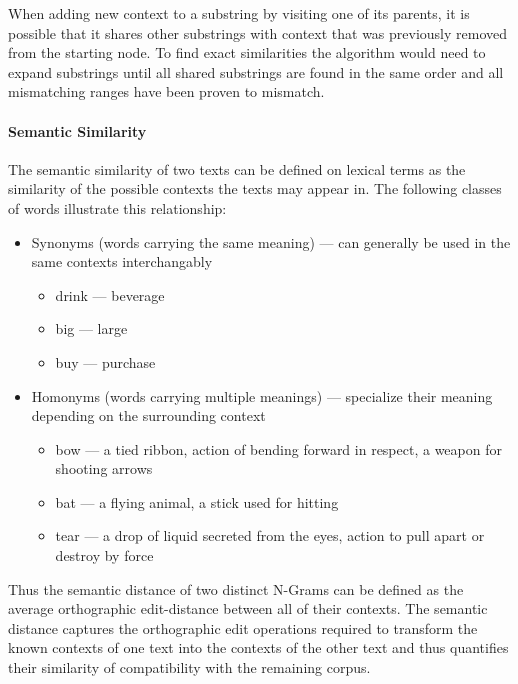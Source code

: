 When adding new context to a substring by visiting one of its parents, it is possible that it shares other substrings with context that was previously removed from the starting node. To find exact similarities the algorithm would need to expand substrings until all shared substrings are found in the same order and all mismatching ranges have been proven to mismatch.

\paragraph{Semantic Similarity}
The semantic similarity of two texts can be defined on lexical terms as the similarity of the possible contexts the texts may appear in. The following classes of words illustrate this relationship:
\begin{itemize}
    \item Synonyms (words carrying the same meaning) --- can generally be used in the same contexts interchangably
        \begin{itemize}
            \item drink --- beverage
            \item big --- large
            \item buy --- purchase
        \end{itemize}
    \item Homonyms (words carrying multiple meanings) --- specialize their meaning depending on the surrounding context
        \begin{itemize}
            \item bow --- a tied ribbon, action of bending forward in respect, a weapon for shooting arrows
            \item bat --- a flying animal, a stick used for hitting
            \item tear --- a drop of liquid secreted from the eyes, action to pull apart or destroy by force
        \end{itemize}
\end{itemize}

Thus the semantic distance of two distinct N-Grams can be defined as the average orthographic edit-distance between all of their contexts.
The semantic distance captures the orthographic edit operations required to
transform the known contexts of one text into the contexts of the other text and
thus quantifies their similarity of compatibility with the remaining corpus.

